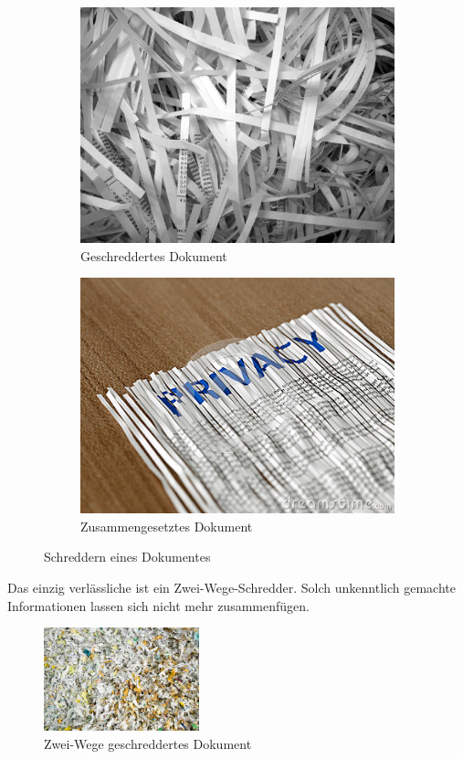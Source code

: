 \begin{figure}[htb]
  \begin{subfigure}[b]{.45\linewidth}
    \centering
    \includegraphics[width=0.5\linewidth]{images/shredded-paper.jpg}
    \caption{Geschreddertes Dokument}
    \label{fig:socialengineering:informationssammlung:quellen:schreddern:subfigures:a}
  \end{subfigure}%
  \begin{subfigure}[b]{.45\linewidth}
    \centering
    \includegraphics[width=0.5\linewidth]{images/reassembled-shredded-paper.jpg}
    \caption{Zusammengesetztes Dokument}
    \label{fig:socialengineering:informationssammlung:quellen:schreddern:subfigures:b}
  \end{subfigure}
  \caption{Schreddern eines Dokumentes}
  \label{fig:socialengineering:informationssammlung:quellen:schreddern:figures}
\end{figure}

Das einzig verlässliche ist ein Zwei-Wege-Schredder. Solch unkenntlich gemachte Informationen lassen sich nicht mehr zusammenfügen.

\begin{figure}[H]
  \centering
  \includegraphics[width=0.4\textwidth]{images/two-way-shredded-paper.jpg}
  \caption[Zwei-Wege geschreddertes Dokument]{Zwei-Wege geschreddertes Dokument}
  \label{fig:socialengineering:informationssammlung:quellen:zwei-wege-schreddern}
\end{figure}

